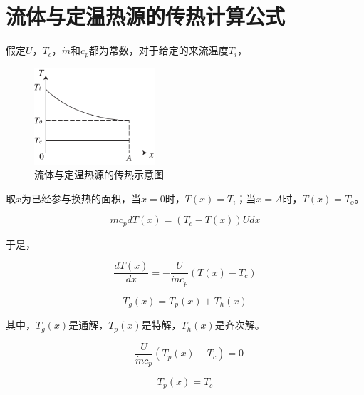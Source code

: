 \appendix

\chapter{流体与定温热源的传热计算公式}
\label{cha:CTHX}
假定$U$，$T_{c}$，$\dot{m}$和$c_{p}$都为常数，对于给定的来流温度$T_{i}$，

\noindent \begin{center}
\begin{figure}[h]
\begin{centering}
\includegraphics[width=0.4\textwidth]{fig/ConstTempHX.pdf}
\par\end{centering}
\caption{流体与定温热源的传热示意图}
\label{fig:CTHX}
\end{figure}
\par\end{center}

取$x$为已经参与换热的面积，当$x=0$时，$T(x)=T_i$；当$x=A$时，$T(x)=T_o$。

\begin{equation}
\dot{m}c_{p}dT(x)=(T_{c}-T(x))Udx
\end{equation}

于是，

\begin{equation}
\frac{dT(x)}{dx}=-\frac{U}{\dot{m}c_{p}}(T(x)-T_{c})
\end{equation}

\begin{equation}
T_{g}(x)=T_{p}(x)+T_{h}(x)
\end{equation}

其中，$T_{g}(x)$是通解，$T_{p}(x)$是特解，$T_{h}(x)$是齐次解。

\begin{equation}
-\frac{U}{\dot{m}c_{p}}(T_{p}(x)-T_{c})=0
\end{equation}

\begin{equation}
T_{p}(x)=T_{c}
\end{equation}

